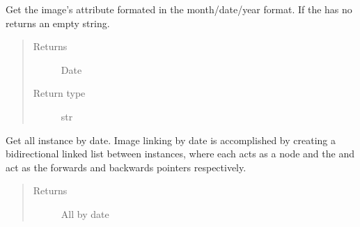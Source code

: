 \documentclass[letterpaper,10pt,english]{sphinxmanual}
\begin{document}
\begin{fulllineitems}
\begin{fulllineitems}
\label{\detokenize{polo.crystallography:polo.crystallography.image.Image.formated_date}}
Get the image’s 
attribute formated in the month/date/year format. If the 
{\hyperref[\detokenize{polo.crystallography:polo.crystallography.image.Image}]{}} 
has no {\hyperref[\detokenize{polo.crystallography:polo.crystallography.image.Image.date}]{}} returns
an empty string.
\begin{quote}\begin{description}
\item[{Returns}] \leavevmode
Date

\item[{Return type}] \leavevmode
str

\end{description}\end{quote}

\end{fulllineitems}


\begin{fulllineitems}
\label{\detokenize{polo.crystallography:polo.crystallography.image.Image.get_linked_images_by_date}}
Get all 
instance by date. Image linking by date is accomplished 
by creating a bi\sphinxhyphen{}directional linked list between 
{\hyperref[\detokenize{polo.crystallography:polo.crystallography.image.Image}]{}} instances, 
where each {\hyperref[\detokenize{polo.crystallography:polo.crystallography.image.Image}]{}} acts as a node
and the  and 
act as the forwards and backwards pointers respectively.
\begin{quote}\begin{description}
\item[{Returns}] \leavevmode
All 
by date


\end{description}
\end{quote}
\end{fulllineitems}
\end{fulllineitems}
\end{document}
